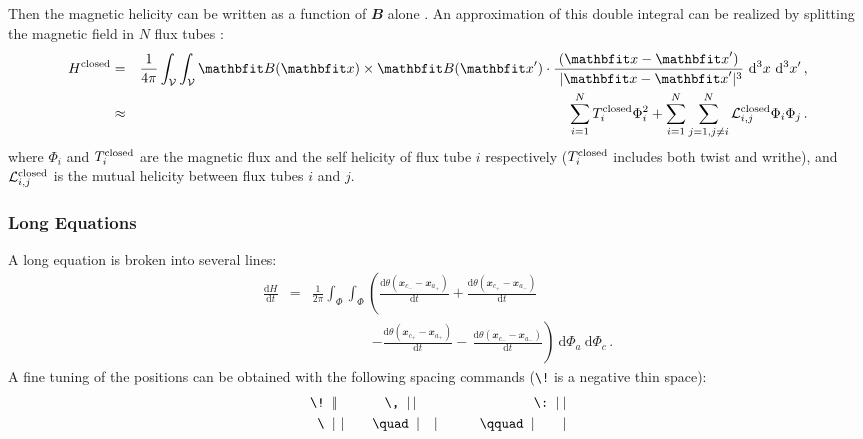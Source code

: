 \documentclass[namedreferences]{solarphysics}
\renewcommand{\vec}[1]{{\mathbfit #1}}
\newcommand{\deriv}[2]{\frac{{\mathrm d} #1}{{\mathrm d} #2}}
\newcommand{\rmd}{ {\ \mathrm d} }
\newcommand{\vol}{ {\mathcal V} }
\newcommand{\dv}{~{\mathrm d}^3 x}
\newcommand{\intv}{\int_{\vol}^{}}
\newcommand{\bb}{\vec B}
\newcommand{\xx}{ \vec x}
\begin{document}
\begin{article}
Then the magnetic helicity can be written as a function of $\bb$
alone \citep{Moffatt69}. An approximation of this double integral 
can be realized by splitting
the magnetic field in $N$ flux tubes \citep{BergerF84}:
   \begin{eqnarray}   
    H^{\rm closed} &=& \frac{1}{4\pi} \intv \intv
                      \bb (\xx ) \times \bb (\xx ^\prime )
                      \cdot \frac{(\xx  - \xx ^\prime)}{\,\, |\xx - \xx ^\prime |^3}
                      \dv \dv ^\prime \,,                     \label{Eq-H-B} \\      
                  &\approx & \sum_{i=1}^N T_i^{\rm closed} \Phi_i^2
                           + \sum_{i=1}^N \sum_{j=1,j \neq i}^N
                             {\mathcal L}^{\rm closed}_{i,j} \Phi_i \Phi_j  \,.
                       \label{Eq-H-N}     %
   \end{eqnarray}
where $\Phi_i$ and $T_i^{\rm closed}$ are the magnetic flux and the
self helicity of flux tube $i$ respectively ($T_i^{\rm closed}$
includes both twist and writhe), and ${\mathcal L}^{\rm
closed}_{i,j}$ is the mutual helicity between flux tubes $i$ and
$j$.

\subsubsection{Long Equations} %
  \label{S-long-equations}
 A long equation is broken into several lines:
      \begin{eqnarray}
      \deriv{H}{t} &=& 
                    \frac{1}{2 \pi} \int_{\Phi } \int_{\Phi }
                    \left(   \deriv{ \theta (\xx _{c_-} -\xx _{a_+}) }{t}
                           + \deriv{ \theta (\xx _{c_+} -\xx _{a_-}) }{t}
                    \right.                            \nonumber  \\
       && \qquad \qquad \;
                    \left. - \deriv{ \theta (\xx _{c_+} -\xx _{a_+}) }{t}
                         -\, \deriv{ \theta (\xx _{c_-} -\xx _{a_-}) }{t}
                    \right) 
                    \rmd \Phi_{a} \rmd \Phi_{c}  \,. \label{Eq-dH-Phi}
      \end{eqnarray}
A fine tuning of the positions can be obtained with the following spacing commands
(\verb+\!+ is a negative thin space):
     \begin{eqnarray} 
     \verb+\! + |\!| \,\  \qquad &    \! \verb+  \, + |\,|    
                          & \qquad    \verb+    \: + |\:|       \nonumber \\
     \verb+\ + |\ |       \qquad &    \verb+\quad + |\quad| 
                          & \qquad    \verb+\qquad + |\qquad|   \nonumber  
     \end{eqnarray}



\end{article}
\end{document}
